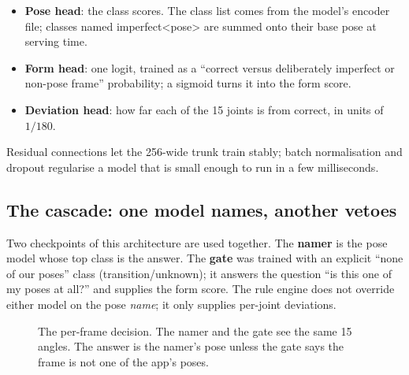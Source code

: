 \documentclass[11pt,a4paper]{article}
\newcommand{\vfour}{v4}
\newcommand{\ubrk}{\textunderscore\allowbreak}
\DeclareRobustCommand{\code}[1]{{\ttfamily\small\let\_\ubrk #1}}
\begin{document}
\begin{itemize}
\item \textbf{Pose head}: the class scores. The class list comes from the model's encoder file; classes named \code{imperfect\_<pose>} are summed onto their base pose at serving time.
\item \textbf{Form head}: one logit, trained as a ``correct versus deliberately imperfect or non-pose frame'' probability; a sigmoid turns it into the form score.
\item \textbf{Deviation head}: how far each of the 15 joints is from correct, in units of $1/180$.
\end{itemize}
Residual connections let the 256-wide trunk train stably; batch normalisation and dropout regularise a model that is small enough to run in a few milliseconds.

\subsection{The cascade: one model names, another vetoes}\label{sec:cascade}
Two checkpoints of this architecture are used together. The \textbf{namer} is the pose model whose top class is the answer. The \textbf{gate} was trained with an explicit ``none of our poses'' class (\code{transition/unknown}); it answers the question ``is this one of my poses at all?'' and supplies the form score. The rule engine does not override either model on the pose \emph{name}; it only supplies per-joint deviations.

\begin{figure}[ht]
\centering
{}
\caption{The per-frame decision. The namer and the gate see the same 15 angles. The answer is the namer's pose unless the gate says the frame is not one of the app's poses.}
\label{fig:cascade}
\end{figure}
\end{document}
